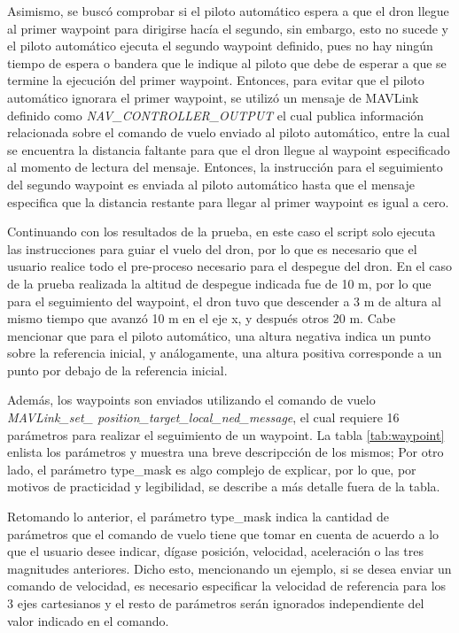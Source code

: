 Asimismo, se buscó comprobar si el piloto automático espera a que el dron llegue al primer waypoint para dirigirse hacía el segundo, sin embargo, esto no sucede y el piloto automático ejecuta el segundo waypoint definido, pues no hay ningún tiempo de espera o bandera que le indique al piloto que debe de esperar a que se termine la ejecución del primer waypoint. Entonces, para evitar que el piloto automático ignorara el primer waypoint, se utilizó un mensaje de MAVLink definido como \textit{NAV\_CONTROLLER\_OUTPUT} el cual publica información relacionada sobre el comando de vuelo enviado al piloto automático, entre la cual se encuentra la distancia faltante para que el dron llegue al waypoint especificado al momento de lectura del mensaje. Entonces, la instrucción para el seguimiento del segundo waypoint es enviada al piloto automático hasta que el mensaje especifica que la distancia restante para llegar al primer waypoint es igual a cero.

Continuando con los resultados de la prueba, en este caso el script solo ejecuta las instrucciones para guiar el vuelo del dron, por lo que es necesario que el usuario realice todo el pre-proceso necesario para el despegue del dron. En el caso de la prueba realizada la altitud de despegue indicada fue de 10 m, por lo que para el seguimiento del waypoint, el dron tuvo que descender a 3 m de altura al mismo tiempo que avanzó 10 m en el eje x, y después otros 20 m. Cabe mencionar que para el piloto automático, una altura negativa indica un punto sobre la referencia inicial, y análogamente, una altura positiva corresponde a un punto por debajo de la referencia inicial. 

Además, los waypoints son enviados utilizando el comando de vuelo \textit{MAVLink\_set\_ position\_target\_local\_ned\_message}, el cual requiere 16 parámetros para realizar el seguimiento de un waypoint. La tabla \ref{tab:waypoint} enlista los parámetros y muestra una breve descripcción de los mismos; Por otro lado, el parámetro type\_mask  es algo complejo de explicar, por lo que, por motivos de practicidad y legibilidad, se describe a más detalle fuera de la tabla.

Retomando lo anterior, el parámetro type\_mask indica la cantidad de parámetros que el comando de vuelo tiene que tomar en cuenta de acuerdo a lo que el usuario desee indicar, dígase posición, velocidad, aceleración o las tres magnitudes anteriores. Dicho esto, mencionando un ejemplo, si se desea enviar un comando de velocidad, es necesario especificar la velocidad de referencia para los 3 ejes cartesianos y el resto de parámetros serán ignorados independiente del valor indicado en el comando.

